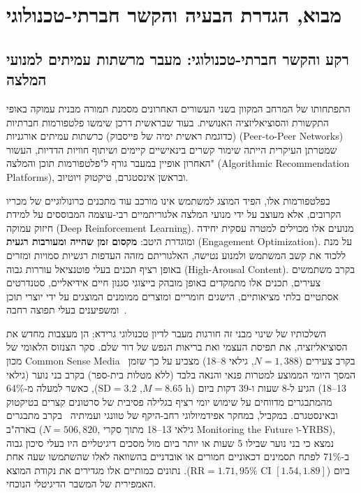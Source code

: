 \chapter{מבוא, הגדרת הבעיה והקשר חברתי-טכנולוגי}
\label{chap:introduction}

\section{רקע והקשר חברתי-טכנולוגי: מעבר מרשתות עמיתים למנועי המלצה}
\label{sec:intro_background}
התפתחותו של המרחב המקוון בשני העשורים האחרונים מסמנת תמורה מבנית עמוקה באופי התקשורת והסוציאליזציה האנושית. בעוד שבראשית דרכן שימשו פלטפורמות חברתיות (כדוגמת ראשית ימיה של פייסבוק) כרשתות עמיתים אורגניות (\textenglish{Peer-to-Peer Networks}) שמטרתן העיקרית הייתה שימור קשרים בינאישיים קיימים ושיתוף חוויות הדדיות, העשור האחרון אופיין במעבר גורף ל"פלטפורמות תוכן והמלצה" (\textenglish{Algorithmic Recommendation Platforms}), ובראשן אינסטגרם, טיקטוק ויוטיוב.

בפלטפורמות אלו, הפיד המוצג למשתמש אינו מורכב עוד מתכנים כרונולוגיים של מכריו הקרובים, אלא מעוצב על ידי מנועי המלצה אלגוריתמיים רבי-עוצמה המבוססים על למידת חיזוק עמוקה (\textenglish{Deep Reinforcement Learning}). מנועים אלו מכוילים למטרה עסקית יחידה ומוגדרת היטב: \textbf{מקסום זמן שהייה ומעורבות רגעית} (\textenglish{Engagement Optimization}). על מנת ללכוד את קשב המשתמש ולמנוע נטישה, האלגוריתם מזהה העדפות רגשיות סמויות ומזרים באופן רציף תכנים בעלי פוטנציאל עוררות גבוה (\textenglish{High-Arousal Content}). בקרב משתמשים צעירים, תכנים אלו מתמקדים באופן מובהק בייצוגי סגנון חיים אידיאליים, סטנדרטים אסתטיים בלתי מציאותיים, הישגים חומריים ומוצרים ממומנים המוצגים על ידי יוצרי תוכן ומשפיענים בעלי תפוצה רחבה~\cite{lou2019influencer, deveirman2017marketing}.

השלכותיו של שינוי מבני זה חורגות מעבר לדיון טכנולוגי גרידא; הן מעצבות מחדש את הסוציאליזציה, את תפיסת העצמי ואת בריאות הנפש של דור שלם. סקר הצנזוס הלאומי של מכון \textenglish{Common Sense Media}~\cite{rideout2022common} בקרב צעירים ($N = 1{,}388$, גילאי 8--18) מצביע על כך שזמן המסך היומי הממוצע למטרות פנאי והנאה בלבד (ללא מטלות בית-ספר) בקרב בני נוער (גילאי 13--18) הגיע ל-8 שעות ו-39 דקות ביום ($M = 8.65\text{ h}$, $\text{SD} = 3.2$), כאשר למעלה מ-64\% מהמתבגרים מדווחים על שימוש יומי רציף בגלילה פסיבית של סרטונים קצרים בטיקטוק ובאינסטגרם. במקביל, במחקר אפידמיולוגי רחב-היקף של טוונגי ועמיתיה~\cite{twenge2018increases} בקרב מתבגרים בארה"ב ($N = 506{,}820$, גילאי 13--18 מתוך סקרי \textenglish{Monitoring the Future} ו-\textenglish{YRBS}), נמצא כי בני נוער שבילו 5 שעות או יותר ביום מול מסכים דיגיטליים היו בעלי סיכון גבוה ב-71\% לפתח תסמינים דכאוניים חמורים או אובדניים בהשוואה לאלו שהשתמשו שעה אחת ביום ($\text{RR} = 1.71, 95\%\text{ CI } [1.54, 1.89]$). נתונים כמותיים אלו מגדירים את נקודת המוצא האמפירית של המשבר הדיגיטלי הנוכחי.

